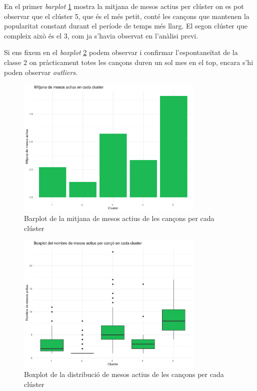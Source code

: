 En el primer \textit{barplot} \ref{fig:TS_barplot_mitjanes_mesos_actius} mostra la mitjana de mesos actius per clúster on es pot observar que el clúster 5, que és el més petit, conté les cançons que mantenen la popularitat constant durant el període de temps més llarg. El segon clúster que compleix això és el 3, com ja s'havia observat en l'anàlisi previ. 

Si ens fixem en el \textit{boxplot} \ref{fig:TS_boxplot_mesos_actius} podem observar i confirmar l'espontaneïtat de la classe 2 on pràcticament totes les cançons duren un sol mes en el top, encara s'hi poden observar \textit{outliers}.

\begin{figure}[H]
    \centering
    \includegraphics[width=0.8\textwidth]{Images/4_clustering/time_series/barplot_mitjanes_mesos_actius.png}
    \caption{Barplot de la mitjana de mesos actius de les cançons per cada clúster}
    \label{fig:TS_barplot_mitjanes_mesos_actius}
\end{figure}

\begin{figure}[H]
    \centering
    \includegraphics[width=0.8\textwidth]{Images/4_clustering/time_series/boxplot_mesos_actius.png}
    \caption{Boxplot de la distribució de mesos actius de les cançons per cada clúster}
    \label{fig:TS_boxplot_mesos_actius}
\end{figure}

